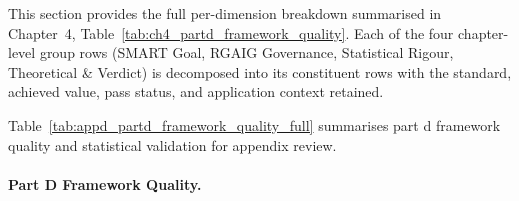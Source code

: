 \noindent This section provides the full per-dimension breakdown summarised in Chapter~4, Table~\ref{tab:ch4_partd_framework_quality}. Each of the four chapter-level group rows (SMART Goal, RGAIG Governance, Statistical Rigour, Theoretical \& Verdict) is decomposed into its constituent rows with the standard, achieved value, pass status, and application context retained.

\noindent Table~\ref{tab:appd_partd_framework_quality_full} summarises part d framework quality and statistical validation for appendix review.

\paragraph{Part D Framework Quality.}




